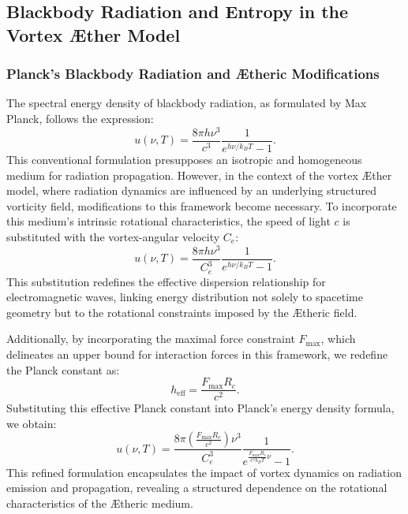 
\subsection{Blackbody Radiation and Entropy in the Vortex \AE{}ther Model}


\subsubsection*{Planck's Blackbody Radiation and \AE{}theric Modifications}
The spectral energy density of blackbody radiation, as formulated by Max Planck, follows the expression:
\begin{equation*}
u(\nu, T) = \frac{8 \pi h \nu^3}{c^3} \frac{1}{e^{h \nu / k_B T} - 1}.
\end{equation*}
This conventional formulation presupposes an isotropic and homogeneous medium for radiation propagation. However, in the context of the vortex \AE{}ther model, where radiation dynamics are influenced by an underlying structured vorticity field, modifications to this framework become necessary. To incorporate this medium’s intrinsic rotational characteristics, the speed of light $c$ is substituted with the vortex-angular velocity $C_e$:
\begin{equation*}
u(\nu, T) = \frac{8 \pi h \nu^3}{C_e^3} \frac{1}{e^{h \nu / k_B T} - 1}.
\end{equation*}
This substitution redefines the effective dispersion relationship for electromagnetic waves, linking energy distribution not solely to spacetime geometry but to the rotational constraints imposed by the \AE{}theric field.


Additionally, by incorporating the maximal force constraint $F_{\max}$, which delineates an upper bound for interaction forces in this framework, we redefine the Planck constant as:
\begin{equation*}
h_\text{eff} = \frac{F_{\max} R_c}{c^2}.
\end{equation*}
Substituting this effective Planck constant into Planck’s energy density formula, we obtain:
\begin{equation*}
u(\nu, T) = \frac{8 \pi \left( \frac{F_{\max} R_c}{c^2} \right) \nu^3}{C_e^3} \frac{1}{e^{\frac{F_{\max} R_c}{c^2 k_B T} \nu} - 1}.
\end{equation*}
This refined formulation encapsulates the impact of vortex dynamics on radiation emission and propagation, revealing a structured dependence on the rotational characteristics of the \AE{}theric medium.



